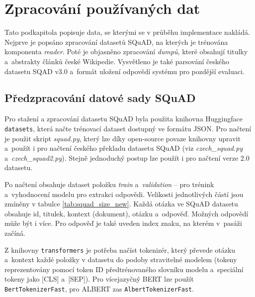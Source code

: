 \section{Zpracování používaných dat}
\label{data_processing}
Tato podkapitola popisuje data, se kterými se v průběhu implementace nakládá. Nejprve je popsáno zpracování datasetů SQuAD, na kterých je trénována komponenta \emph{reader}. Poté je objasněno zpracování \textit{dumpů}, které obsahují titulky a~abstrakty článků české Wikipedie. Vysvětleno je také parsování českého datasetu SQAD v3.0 a~formát uložení odpovědí systému pro pozdější evaluaci. 

\subsection{Předzpracování datové sady SQuAD}
Pro stažení a zpracování datasetu SQuAD byla použita knihovna Huggingface \texttt{ datasets}, která načte trénovací dataset dostupný ve formátu JSON. Pro načtení je použit skript \emph{squad.py}, který lze díky open-source povaze knihovny upravit a~použít i pro načtení českého překladu datasetu SQuAD \cite{cz_suqad_download} (viz \emph{czech\_squad.py} a~\emph{czech\_squad2.py}). Stejně jednoduchý postup lze použít i pro načtení verze 2.0 datasetu.\par
\smallskip
Po načtení obsahuje dataset položku \emph{train} a~\emph{validation} -- pro trénink a~vyhodnocení modelu pro extrakci odpovědi. Velikosti jednotlivých částí jsou zmíněny v tabulce \ref{tab:squad_size_new}. Každá otázka ve SQuAD datasetu obsahuje id, titulek, kontext (dokument), otázku a~odpověď. Možných odpovědí může být i více. Pro odpověď je také uveden index znaku, na kterém v~pasáži začíná.\par
\smallskip
Z knihovny \texttt{transformers} je potřeba načíst tokenizér, který převede otázku a~kontext každé položky v datasetu do podoby stravitelné modelem (tokeny reprezentovány pomocí token ID předtrénovaného slovníku modelu a~speciální tokeny jako [CLS] a~[SEP]). Pro více\-jazyčný BERT lze použít \texttt{BertTokenizerFast}, pro ALBERT zas \texttt{AlbertTokenizerFast}.\par

